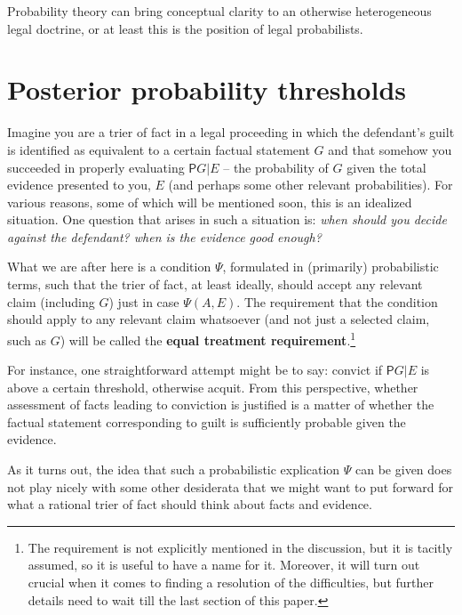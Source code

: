 \documentclass[10pt,dvipsnames,enabledeprecatedfontcommands]{scrartcl}
\newcommand{\pr}{\mathsf{P}}
\begin{document}
Probability theory can bring conceptual clarity to an otherwise
heterogeneous legal doctrine, or at least this is the position of legal
probabilists.

\section{Posterior probability
thresholds}\label{posterior-probability-thresholds}

Imagine you are a trier of fact in a legal proceeding in which the
defendant's guilt is identified as equivalent to a certain factual
statement \(G\) and that somehow you succeeded in properly evaluating
\(\pr{G\vert E}\) -- the probability of \(G\) given the total evidence
presented to you, \(E\) (and perhaps some other relevant probabilities).
For various reasons, some of which will be mentioned soon, this is an
idealized situation. One question that arises in such a situation is:
\emph{when should you decide against the defendant? when is the evidence good enough?}

What we are after here is a condition \(\Psi\), formulated in
(primarily) probabilistic terms, such that the trier of fact, at least
ideally, should accept any relevant claim (including \(G\)) just in case
\(\Psi(A,E)\). The requirement that the condition should apply to any
relevant claim whatsoever (and not just a selected claim, such as \(G\))
will be called the
\textbf{equal treatment requirement}.\footnote{The requirement is not explicitly mentioned in the discussion, but it is tacitly assumed, so it is useful to have a name for it. Moreover, it will turn out crucial when it comes to finding a resolution of the difficulties, but further details need to wait till the last section of this paper.}

For instance, one straightforward attempt might be to say: convict if
\(\pr{G\vert E}\) is above a certain threshold, otherwise acquit. From
this perspective, whether assessment of facts leading to conviction is
justified is a matter of whether the factual statement corresponding to
guilt is sufficiently probable given the evidence.

As it turns out, the idea that such a probabilistic explication \(\Psi\)
can be given does not play nicely with some other desiderata that we
might want to put forward for what a rational trier of fact should think
about facts and evidence.
\end{document}
